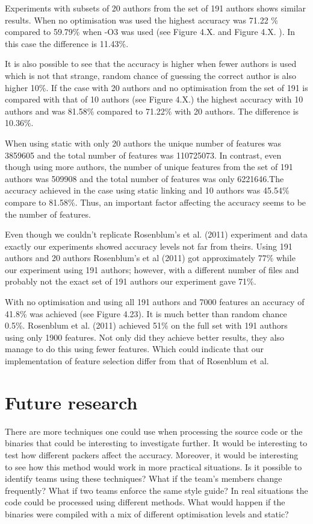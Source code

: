 \documentclass[a4paper,11pt]{kth-mag}
\begin{document}
Experiments with subsets of 20 authors from the set of 191 authors shows
similar results. When no optimisation was used the highest accuracy was 71.22
\% compared to 59.79\% when -O3 was used (see Figure 4.X. and  Figure 4.X. ).
In this case the difference is 11.43\%.

It is also possible to see that the accuracy is higher when fewer authors is
used which is not that strange, random chance of guessing the correct author is
also higher 10\%. If the case with 20 authors and no optimisation from the set
of 191 is compared with that of 10 authors (see Figure 4.X.) the highest
accuracy with 10 authors and was 81.58\% compared to 71.22\% with 20 authors.
The difference is 10.36\%.

When using static with only 20 authors the unique number of features was
3859605 and the total number of features was 110725073. In contrast, even
though using more authors,  the number of unique features from the set of 191
authors was 509908 and the total number of features was only 6221646.The
accuracy achieved in the case using static linking and 10 authors was 45.54\%
compare to 81.58\%. Thus, an important factor affecting the accuracy seems to
be the number of features. 

Even though we couldn’t replicate Rosenblum’s et al. (2011) experiment and data
exactly our experiments showed accuracy levels not far from theirs. Using 191
authors and 20 authors Rosenblum’s et al (2011) got approximately 77\% while
our experiment using 191 authors; however, with a different number of files and
probably not the exact set of 191 authors our experiment gave 71\%.     

With no optimisation and using all 191 authors and 7000 features an accuracy of
41.8\% was achieved (see Figure 4.23). It is much better than random chance
0.5\%. Rosenblum et al. (2011) achieved 51\% on the full set with 191 authors
using only 1900 features. Not only did they achieve better results, they also
manage to do this using fewer features. Which could indicate that our
implementation of feature selection differ from that of Rosenblum et al.

\section{Future research}
There are more techniques one could use when processing the source code or the
binaries that could be interesting to investigate further. It would be
interesting to test how different packers affect the accuracy. Moreover, it
would be interesting to see how this method would work in more practical
situations. Is it possible to identify teams using these techniques? What if
the team’s members change frequently? What if two teams enforce the same style
guide? In real situations the code could be processed using different methods.
What would happen if the binaries were compiled with a mix of different
optimisation levels and static?  
\end{document}
